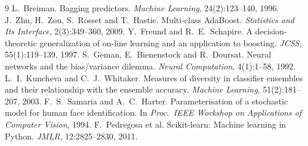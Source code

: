 \documentclass[10pt,twocolumn,letterpaper]{article}
\begin{document}
{\small
\begin{thebibliography}{9}
 L.~Breiman. Bagging predictors. \emph{Machine Learning}, 24(2):123--140, 1996.
 J.~Zhu, H.~Zou, S.~Rosset and T.~Hastie. Multi-class AdaBoost. \emph{Statistics and Its Interface}, 2(3):349--360, 2009.
 Y.~Freund and R.~E.~Schapire. A decision-theoretic generalization of on-line learning and an application to boosting. \emph{JCSS}, 55(1):119--139, 1997.
 S.~Geman, E.~Bienenstock and R.~Doursat. Neural networks and the bias/variance dilemma. \emph{Neural Computation}, 4(1):1--58, 1992.
 L.~I.~Kuncheva and C.~J.~Whitaker. Measures of diversity in classifier ensembles and their relationship with the ensemble accuracy. \emph{Machine Learning}, 51(2):181--207, 2003.
 F.~S.~Samaria and A.~C.~Harter. Parameterisation of a stochastic model for human face identification. In \emph{Proc.\ IEEE Workshop on Applications of Computer Vision}, 1994.
 F.~Pedregosa et al. Scikit-learn: Machine learning in Python. \emph{JMLR}, 12:2825--2830, 2011.
\end{thebibliography}
}
\end{document}
